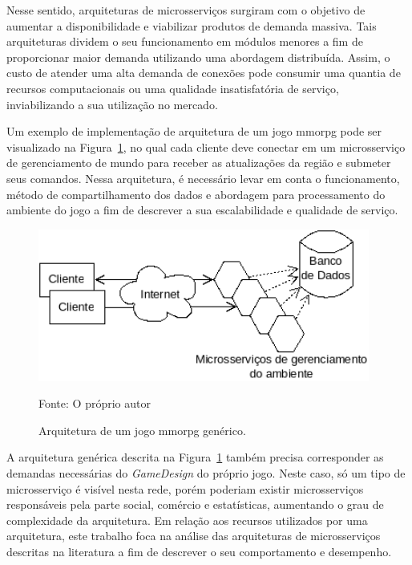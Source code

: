 Nesse sentido, arquiteturas de microsserviços surgiram com o objetivo de aumentar a disponibilidade e viabilizar produtos de demanda massiva.
%
Tais arquiteturas dividem o seu funcionamento em módulos menores a fim de proporcionar maior demanda utilizando uma abordagem distribuída.
%
Assim, o custo de atender uma alta demanda de conexões pode consumir uma quantia de recursos computacionais ou uma qualidade insatisfatória de serviço, inviabilizando a sua utilização no mercado.



Um exemplo de implementação de arquitetura de um jogo \ac{mmorpg} pode ser visualizado na Figura~\ref{fig:generica}, no qual cada cliente deve conectar em um microsserviço de gerenciamento de mundo para receber as atualizações da região e submeter seus comandos.
%
Nessa arquitetura, é necessário levar em conta o funcionamento, método de compartilhamento dos dados e abordagem para processamento do ambiente do jogo a fim de descrever a sua escalabilidade e qualidade de serviço.


\begin{figure}[htb!]
\caption{Arquitetura de um jogo \ac{mmorpg} genérico.}
\label{fig:generica}
\includegraphics[height=5.0cm]{img/cap3/generica.png}
\centering

Fonte: O próprio autor
\end{figure}

A arquitetura genérica descrita na Figura~\ref{fig:generica} também precisa corresponder as demandas necessárias do \textit{GameDesign} do próprio jogo.
%
Neste caso, só um tipo de microsserviço é visível nesta rede, porém poderiam existir microsserviços responsáveis pela parte social, comércio e estatísticas, aumentando o grau de complexidade da arquitetura.
%
Em relação aos recursos utilizados por uma arquitetura, este trabalho foca na análise das arquiteturas de microsserviços descritas na literatura a fim de descrever o seu comportamento e desempenho.



